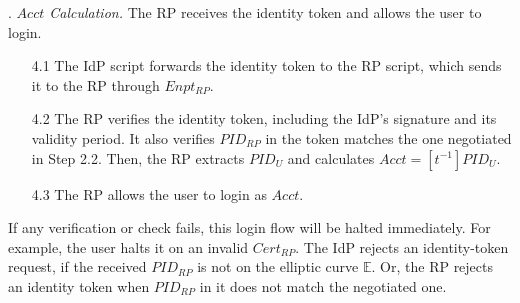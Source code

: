 . {\em $Acct$ Calculation.}
The RP receives the identity token and allows the user to login.
\vspace{-\topsep}
\begin{itemize}
\setlength{\topsep}{0pt}
\setlength{\partopsep}{0pt}
\setlength{\itemsep}{0pt}
\setlength{\parsep}{0pt}
\setlength{\parskip}{0pt}
\item [4.1]
The IdP script forwards the identity token to the RP script,
    which sends it to the RP through $Enpt_{RP}$.
\item[4.2] The RP verifies the identity token, including the IdP's signature and its validity period.
It also verifies $PID_{RP}$ in the token matches the one negotiated in Step 2.2.
Then, the RP extracts $PID_U$ and calculates $Acct = [t^{-1}]{PID_U}$.

\item [4.3] The RP allows the user to login as $Acct$.

\end{itemize}


If any verification or check fails,
     this login flow will be halted immediately.
For example, the user halts it
    on an invalid $Cert_{RP}$.
The IdP rejects an identity-token request, if the received $PID_{RP}$ is not on the elliptic curve $\mathbb{E}$.
Or, the RP rejects an identity token
    when $PID_{RP}$ in it does not match the negotiated one.



